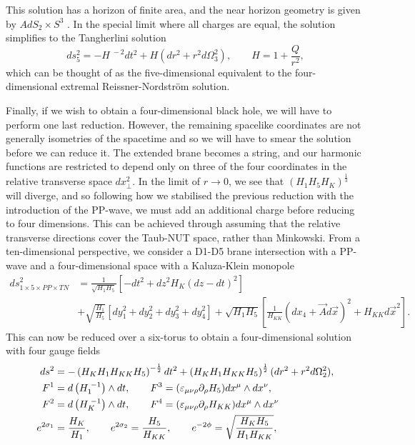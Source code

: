 This solution has a horizon of finite area, and the near horizon geometry is given by $AdS_2 \times S^3$ \cite{Behrndt}. In the special limit where all charges are equal, the solution simplifies to the Tangherlini solution \cite{Tangherlini:1963bw}
\begin{equation*}
	ds^2_5 = -H^{\; -2} dt^2 + H \left(dr^2 + r^2 d\Omega_3^2 \right), \qquad H = 1 + \frac{Q}{r^2},
\end{equation*}
which can be thought of as the five-dimensional equivalent to the four-dimensional extremal Reissner-Nordstr\"om solution. 

Finally, if we wish to obtain a four-dimensional black hole, we will have to perform one last reduction. However, the remaining spacelike coordinates are not generally isometries of the spacetime and so we will have to smear the solution before we can reduce it. The extended brane becomes a string, and our harmonic functions are restricted to depend only on three of the four coordinates in the relative transverse space $dx^2_\perp$. In the limit of $r \rightarrow 0$, we see that $\left(H_1 H_5 H_K\right)^{\frac{1}{3}}$ will diverge, and so following how we stabilised the previous reduction with the introduction of the PP-wave, we must add an additional charge before reducing to four dimensions. This can be achieved through assuming that the relative transverse directions cover the Taub-NUT space, rather than Minkowski. From a ten-dimensional perspective, we consider a D1-D5 brane intersection with a PP-wave and a four-dimensional space with a Kaluza-Klein monopole \cite{Behrndt}
\begin{equation}
\begin{aligned}
\label{eq:d1d5kkpp}
	ds^2_{1 \times 5 \times PP \times TN} &= \frac{1}{\sqrt{H_1 H_5}} \left[-dt^2 + dz^2 H_K(dz - dt)^2 \right] \\
	&+  \sqrt{\frac{H_1}{H_5}} \left[dy_1^2 + dy_2^2 + dy_3^2 + dy_4^2 \right] + \sqrt{H_1 H_5} \left[ \frac{1}{H_{KK}} (dx_4 + \vec{A} d\vec{x})^2 + H_{KK} d\vec{x}^2 \right].
\end{aligned}
\end{equation}
This can now be reduced over a six-torus to obtain a four-dimensional solution with four gauge fields \cite{Behrndt}
\begin{equation}
\label{eq:d1d5kkppred}
	\begin{aligned}
		ds^2 &= - \left(H_K H_1 H_{KK} H_5 \right)^{-\frac{1}{2}} dt^2 + \left(H_K H_1 H_{KK} H_5 \right)^{\frac{1}{2}} (dr^2 + r^2 d\Omega_2^2) ,\\
		F^1 &= d \left( H_1^{\; -1} \right) \wedge dt, \qquad F^3 = ({\varepsilon}_{\mu \nu \rho} \partial_\rho H_5) dx^\mu \wedge dx^\nu, \\
		F^2 &= d \left( H_K^{\; -1} \right) \wedge dt, \qquad F^4 = ({\varepsilon}_{\mu \nu \rho} \partial_\rho H_{KK}) dx^\mu \wedge dx^\nu \\
		e^{2\sigma_1} &= \frac{H_{K}}{H_1}, \qquad e^{2\sigma_2} =\frac{H_5}{H_{KK}}, \qquad e^{-2\phi} = \sqrt{\frac{H_{K} H_5}{H_1 H_{KK}}},
	\end{aligned}
\end{equation}
